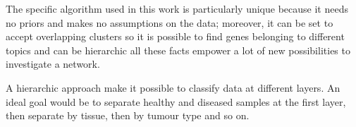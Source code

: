 The specific algorithm used in this work is particularly unique because
it needs no priors and makes no assumptions on the data; moreover, it can
be set to accept overlapping clusters so it is possible to find genes
belonging to different topics and can be hierarchic all these facts
empower a lot of new possibilities to investigate a network.

A hierarchic approach make it possible to classify data at different
layers. An ideal goal would be to separate healthy and diseased samples
at the first layer, then separate by tissue, then by tumour type and so
on.
